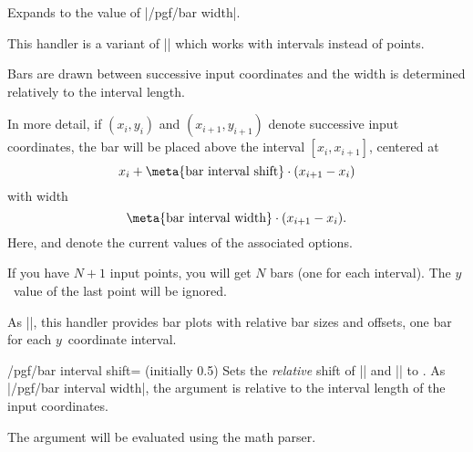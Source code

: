 \begin{command}{\pgfplotbarwidth}
	Expands to the value of |/pgf/bar width|.
\end{command}


\begin{command}{\pgfplothandlerybarinterval}
  This handler is a variant of |\pgfplothandlerybar| which works with intervals instead of points.
  
  Bars are drawn between successive input coordinates and the width is determined relatively to the interval length.
  
\begin{codeexample}[]
\end{codeexample}

In more detail, if $(x_i,y_i)$ and $(x_{i+1},y_{i+1})$ denote successive input coordinates, the bar will be placed above the interval $[x_i,x_{i+1}]$, centered at
\[ x_i + \text{\meta{bar interval shift}} \cdot (x_{i+1} - x_i) \]
with width
\[ \text{\meta{bar interval width}} \cdot (x_{i+1} - x_i). \]
Here,  and  denote the current values of the associated options.

If you have $N+1$ input points, you will get $N$ bars (one for each interval). The $y$~value of the last point will be ignored.
\end{command}

\begin{command}{\pgfplothandlerxbarinterval}
   As |\pgfplothandlerybarinterval|, this handler provides bar plots with relative bar sizes and offsets, one bar for each $y$~coordinate interval.
\end{command}

\label{key-bar-interval-shift}%
\begin{key}{/pgf/bar interval shift= (initially 0.5)}
	Sets the \emph{relative} shift of |\pgfplothandlerxbarinterval| and |\pgfplothandlerybarinterval| to . As |/pgf/bar interval width|, the argument is relative to the interval length of the input coordinates.
	
	The argument  will be evaluated using the math parser.
\end{key}

